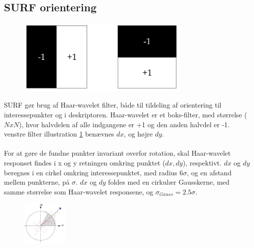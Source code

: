 \subsection{SURF orientering}
\begin{figure}[H]
    \centering
    \includegraphics[width=0.75\textwidth]{fig/haarwavelet.png}
     \vspace{-1em}
    \begin{center}    
       \caption{\textcolor{gray}{\footnotesize \textit{ }}}
    \label{fig:haarwavelet}
     \end{center}
     \vspace{-2.5em}
  \end{figure} \noindent
SURF gør brug af Haar-wavelet filter, både til tildeling af orientering til interessepunkter og i deskriptoren. Haar-wavelet er et boks-filter, med størrelse ($NxN$), hvor halvdelen af alle indgangene er +1 og den anden halvdel er -1. venstre filter illustration \ref{fig:haarwavelet} benævnes $dx$, og højre $dy$.
\\
\\
For at gøre de fundne punkter invariant overfor rotation, skal Haar-wavelet responset findes i x og y retningen omkring punktet ($dx, dy$), respektivt. $dx$ og $dy$ beregnes i en cirkel omkring interessepunktet, med radius $6\sigma$, og en afstand mellem punkterne, på $\sigma$. $dx$ og $dy$ foldes med en cirkulær Gausskerne, med samme størrelse som Haar-wavelet responsene, og $\sigma_{Gauss} = 2.5\sigma$.
\begin{figure}[H]
    \centering
    \includegraphics[width=0.2\textwidth]{fig/surforientation.jpg}
     \vspace{-1em}
    \begin{center}    
       \caption{\textcolor{gray}{\footnotesize \textit{ }}}
    \label{fig:surforientation}
     \end{center}
     \vspace{-2.5em}
  \end{figure} \noindent
